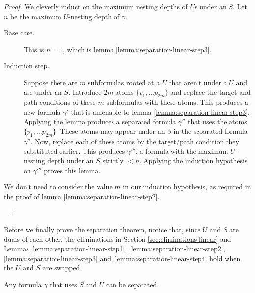 \documentclass[a4paper,UKenglish,cleveref, autoref, thm-restate, numberwithinsect]{lipics-v2021}
\begin{document}
\begin{proof}
    We cleverly induct on the maximum nesting depths of $U$s under an $S$. Let $n$ be the maximum $U$-nesting depth of $\gamma$.
    \begin{description}
        \item[Base case.] This is $n = 1$, which is lemma \ref{lemma:separation-linear-step3}.
        \item[Induction step.] Suppose there are $m$ subformulas rooted at a $U$ that aren't under a $U$ and are under an $S$. Introduce $2m$ atoms $\{p_1, \ldots p_{2m}\}$ and replace the target and path conditions of these $m$ subformulas with these atoms. This produces a new formula $\gamma'$ that is amenable to lemma \ref{lemma:separation-linear-step3}. Applying the lemma produces a separated formula $\gamma''$ that uses the atoms $\{p_1, \ldots p_{2m}\}$. These atoms may appear under an $S$ in the separated formula $\gamma''$. Now, replace each of these atoms by the target/path condition they substituted earlier. This produces $\gamma'''$, a formula with the maximum $U$-nesting depth under an $S$ strictly $< n$. Applying the induction hypothesis on $\gamma'''$ proves this lemma.
    \end{description}
    \begin{remark*}
        We don't need to consider the value $m$ in our induction hypothesis, as required in the proof of lemma \ref{lemma:separation-linear-step2}.
    \end{remark*}
\end{proof}
Before we finally prove the separation theorem, notice that, since $U$ and $S$ are duals of each other, the eliminations in Section \ref{sec:eliminations-linear} and Lemmas \ref{lemma:separation-linear-step1}, \ref{lemma:separation-linear-step2}, \ref{lemma:separation-linear-step3} and \ref{lemma:separation-linear-step4} hold when the $U$ and $S$ are swapped.
\begin{theorem}
    \label{theorem:separation-linear-final}
    Any formula $\gamma$ that uses $S$ and $U$ can be separated.
\end{theorem}
\end{document}
